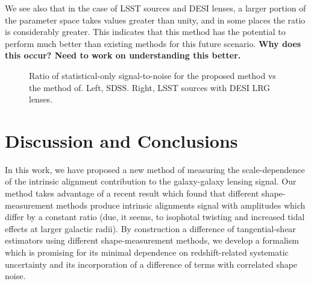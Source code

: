 \documentclass[a4paper,fleqn,usenatbib]{mnras}
\begin{document}
We see also that in the case of LSST sources and DESI lenses, a larger portion of the parameter space takes values greater than unity, and in some places the ratio is considerably greater. This indicates that this method has the potential to perform much better than existing methods for this future scenario. {\bf Why does this occur? Need to work on understanding this better.}


\begin{figure*}
\centering
{}
\caption{Ratio of statistical-only signal-to-noise for the proposed method vs the method of. Left, SDSS. Right, LSST sources with DESI LRG lenses.}
\label{fig:StoNstat}
\end{figure*}

\section{Discussion and Conclusions}
\label{sec:conclusions}
In this work, we have proposed a new method of measuring the scale-dependence of the intrinsic alignment contribution to the galaxy-galaxy lensing signal. Our method takes advantage of a recent result which found that different shape-measurement methods produce intrinsic alignments signal with amplitudes which differ by a constant ratio (due, it seems, to isophotal twisting and increased tidal effects at larger galactic radii). By construction a difference of tangential-shear estimators using different shape-measurement methods, we develop a formalism which is promising for its minimal dependence on redshift-related systematic uncertainty and its incorporation of a difference of terms with correlated shape noise.
\end{document}
